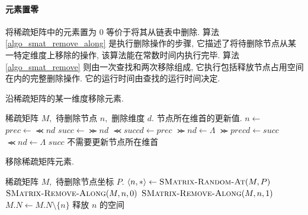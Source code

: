 \paragraph{元素置零} 将稀疏矩阵中的元素置为 $0$ 等价于将其从链表中删除. 算法 \ref{algo_smat_remove_along} 是执行删除操作的步骤, 它描述了将待删除节点从某一特定维度上移除的操作, 该算法能在常数时间内执行完毕. 算法 \ref{algo_smat_remove} 则由一次查找和两次移除组成, 它执行包括释放节点占用空间在内的完整删除操作. 它的运行时间由查找的运行时间决定. 
\begin{breakablealgorithm}
\caption{沿稀疏矩阵的某一维度移除元素.}
\label{algo_smat_remove_along}
\begin{algorithmic}[1]
\Require 稀疏矩阵 $M,$ 待删除节点 $n,$ 删除维度 $d.$
\Ensure 节点所在维首的更新值.
    \State $n \gets$ 
    \State $prec \gets \Prec{n}{d}$
    \State $succ \gets \Succ{n}{d}$
        \State $\Prec{succ}{d} \gets prec$
        \State $\Succ{n}{d} \gets \Lambda$
    \EndIf
        \State $\Succ{prec}{d} \gets succ$
        \State $\Prec{n}{d} \gets \Lambda$
    \Else
        \State \Return $succ$
    \EndIf
    \State \Return 不需要更新节点所在维首
\EndFunction
\end{algorithmic}
\end{breakablealgorithm}

\begin{breakablealgorithm}
\caption{移除稀疏矩阵元素.}
\label{algo_smat_remove}
\begin{algorithmic}[1]
\Require 稀疏矩阵 $M,$ 待删除节点坐标 $P.$
    \State $\left\langle n, *\right\rangle \gets \textsc{SMatrix-Random-At}(M, P)$
    \State $\textsc{SMatrix-Remove-Along}(M, n, 0)$
    \State $\textsc{SMatrix-Remove-Along}(M, n, 1)$
    \State $M.N \gets M.N \setminus \{n\}$
    \State 释放 $n$ 的空间
\EndProcedure
\end{algorithmic}
\end{breakablealgorithm}

